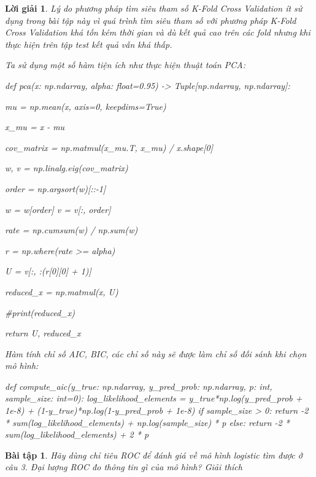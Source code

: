 \documentclass[14pt, a4paper]{article}
\theoremstyle{sltheorem}
\newtheorem{baitap}{Bài tập}
\theoremstyle{soltheorem}
\newtheorem*{loigiai}{Lời giải}
\begin{document}
\begin{loigiai}
    Lý do phương pháp tìm siêu tham số K-Fold Cross Validation ít sử dụng trong bài tập này vì quá trình tìm siêu tham số với phương pháp K-Fold Cross Validation khá tốn kém thời gian và dù kết quả cao trên các fold nhưng khi thực hiện trên tập test kết quả vẫn khá thấp.

    Ta sử dụng một số hàm tiện ích như thực hiện thuật toán PCA:

    \begin{python}
def pca(x: np.ndarray, alpha: float=0.95) -> Tuple[np.ndarray, np.ndarray]:
    
    mu = np.mean(x, axis=0, keepdims=True)

    x_mu = x - mu

    cov_matrix = np.matmul(x_mu.T, x_mu) / x.shape[0]

    w, v = np.linalg.eig(cov_matrix)

    order = np.argsort(w)[::-1]

    w = w[order]
    v = v[:, order]

    rate = np.cumsum(w) / np.sum(w)

    r = np.where(rate >= alpha)

    U = v[:, :(r[0][0] + 1)]

    reduced_x = np.matmul(x, U)

    #print(reduced_x)

    return U, reduced_x
    \end{python}

    Hàm tính chỉ số AIC, BIC, các chỉ số này sẽ được làm chỉ số đối sánh khi chọn mô hình:

    \begin{python}
def compute_aic(y_true: np.ndarray, y_pred_prob: np.ndarray, p: int, sample_size: int=0):
    log_likelihood_elements = y_true*np.log(y_pred_prob + 1e-8) + (1-y_true)*np.log(1-y_pred_prob + 1e-8)
    if sample_size > 0:
        return -2 * sum(log_likelihood_elements) + np.log(sample_size) * p
    else:
        return -2 * sum(log_likelihood_elements) + 2 * p
    \end{python}

    
\end{loigiai}

\begin{baitap}
    Hãy dùng chỉ tiêu ROC để đánh giá về mô hình logistic tìm được ở câu 3. Đại lượng ROC đo thông tin gì của mô hình? Giải thích
\end{baitap}
\end{document}
